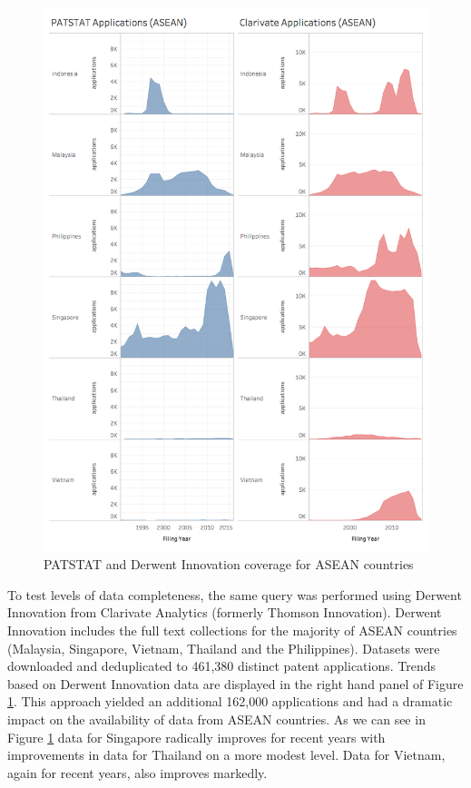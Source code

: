 \documentclass[openany]{book}
\theoremstyle{definition}
\theoremstyle{definition}
\theoremstyle{definition}
\theoremstyle{remark}
\begin{document}
\begin{figure}

{\centering \includegraphics[width=1\linewidth]{images/patstat_and_clarivate} 

}

\caption{PATSTAT and Derwent Innovation coverage for ASEAN countries}\label{fig:coverage}
\end{figure}

To test levels of data completeness, the same query was performed using
Derwent Innovation from Clarivate Analytics (formerly Thomson
Innovation). Derwent Innovation includes the full text collections for
the majority of ASEAN countries (Malaysia, Singapore, Vietnam, Thailand
and the Philippines). Datasets were downloaded and deduplicated to
461,380 distinct patent applications. Trends based on Derwent Innovation
data are displayed in the right hand panel of Figure \ref{fig:coverage}.
This approach yielded an additional 162,000 applications and had a
dramatic impact on the availability of data from ASEAN countries. As we
can see in Figure \ref{fig:coverage} data for Singapore radically
improves for recent years with improvements in data for Thailand on a
more modest level. Data for Vietnam, again for recent years, also
improves markedly.
\end{document}
